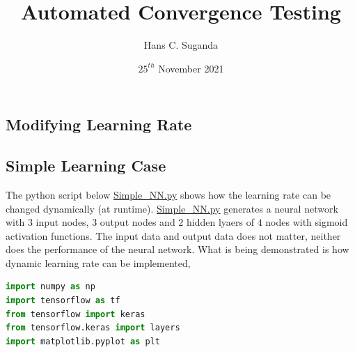 \documentclass[a4paper, 12pt]{report}
\begin{document}
\title{Automated Convergence Testing}
\author{Hans C. Suganda}
\date{$25^{th}$ November 2021}
\maketitle
\newpage


\tableofcontents
\newpage

\begin{center}

\section{Modifying Learning Rate}

\subsection{Simple Learning Case}
The python script below \url{Simple_NN.py} shows how the learning rate can be changed dynamically (at runtime). \url{Simple_NN.py} generates a neural network with $3$ input nodes, $3$ output nodes and $2$ hidden lyaers of $4$ nodes with sigmoid activation functions. The input data and output data does not matter, neither does the performance of the neural network. What is being demonstrated is how dynamic learning rate can be implemented,
\begin{lstlisting}[language=python]
import numpy as np
import tensorflow as tf
from tensorflow import keras
from tensorflow.keras import layers
import matplotlib.pyplot as plt


\end{lstlisting}
\end{center}
\end{document}
